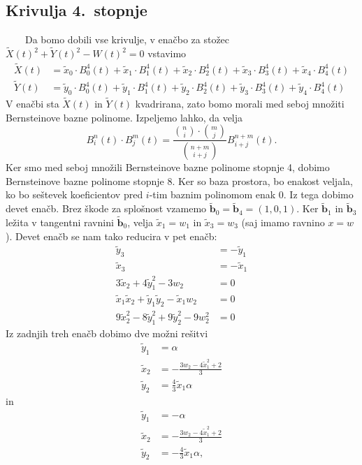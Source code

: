\documentclass[a4paper,11pt]{article}
\theoremstyle{definition}
\theoremstyle{plain}
\begin{document}

\subsection{Krivulja 4.~stopnje}
\ \ \ \
Da bomo dobili vse krivulje, v enačbo za stožec $\tilde{X}(t)^2+\tilde{Y}(t)^2-W(t)^2=0$ vstavimo 
\begin{align*}
\tilde{X}(t) &= \tilde{x}_0\cdot B_0^4(t)+\tilde{x}_1\cdot B_1^4(t)+ \tilde{x}_2\cdot B_2^4(t) + \tilde{x}_3\cdot B_3^4(t) +\tilde{x}_4\cdot B_4^4(t)   \\
\tilde{Y}(t) &=\tilde{y}_0\cdot B_0^4(t)+\tilde{y}_1\cdot B_1^4(t)+\tilde{y}_2\cdot B_2^4(t) + \tilde{y}_3\cdot B_3^4(t) + \tilde{y}_4\cdot B_4^4(t)   
\end{align*}
V enačbi sta $\tilde{X}(t)$ in $\tilde{Y}(t)$ kvadrirana, zato bomo morali med seboj množiti Bernsteinove bazne polinome. Izpeljemo lahko, da velja
$$B_i^n(t)\cdot B_j^m(t)=\frac{\binom{n}{i} \cdot \binom{m}{j}}{\binom{n+m}{i+j}}B_{i+j}^{n+m}(t).$$
Ker smo med seboj množili Bernsteinove bazne polinome stopnje 4, dobimo Bernsteinove bazne polinome stopnje 8. Ker so baza prostora, bo enakost veljala, ko bo seštevek koeficientov pred $i$-tim baznim polinomom enak 0. Iz tega dobimo devet enačb.
Brez škode za splošnost vzamemo $\boldsymbol{\tilde{b}}_0 =\boldsymbol{\tilde{b}}_4 = (1,0,1)$. Ker $\boldsymbol{\tilde{b}}_1$ in $\boldsymbol{\tilde{b}}_3$ ležita v tangentni ravnini $\boldsymbol{\tilde{b}}_0$, velja $\tilde{x}_1=w_1$ in $\tilde{x}_3=w_3$ (saj imamo ravnino $x=w$). Devet enačb se nam tako reducira v pet enačb:
\begin{align*}
\tilde{y}_3 &=- \tilde{y}_1 \\
\tilde{x}_3 &= - \tilde{x}_1 \\
3\tilde{x}_2 + 4\tilde{y}_1^2 - 3w_2 &= 0 \\
\tilde{x}_1\tilde{x}_2 + \tilde{y}_1\tilde{y}_2  - \tilde{x}_1w_2 &= 0 \\
9\tilde{x}_2^2 - 8\tilde{y}_1^2 + 9\tilde{y}_2^2 - 9w_2^2&= 0 
\end{align*}
Iz zadnjih treh enačb dobimo dve možni rešitvi
\begin{align*}
\tilde{y}_1 &= \alpha \\
\tilde{x}_2 &=-\frac{3w_2-4\tilde{x}_1^2+2}{3}\\
\tilde{y}_2 &= \frac{4}{3}\tilde{x}_1\alpha
\end{align*}
in
\begin{align*}
\tilde{y}_1 &= -\alpha \\
\tilde{x}_2 &=-\frac{3w_2-4\tilde{x}_1^2+2}{3}\\
\tilde{y}_2 &= -\frac{4}{3}\tilde{x}_1\alpha,
\end{align*}
\end{document}
